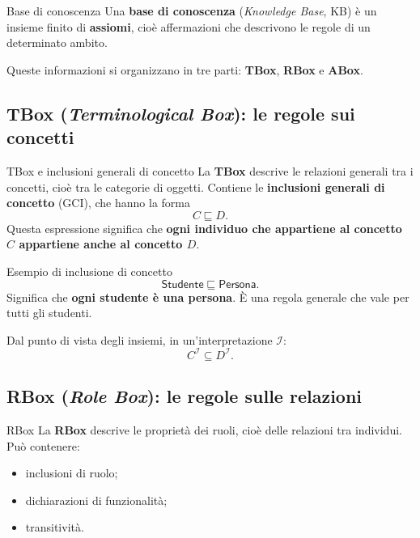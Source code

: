 \begin{definition}{Base di conoscenza}
    Una \textbf{base di conoscenza} (\emph{Knowledge Base}, KB) è un insieme
    finito di \textbf{assiomi}, cioè affermazioni che descrivono le regole di
    un determinato ambito.

    Queste informazioni si organizzano in tre parti: \textbf{TBox},
    \textbf{RBox} e \textbf{ABox}.
\end{definition}

\subsection{TBox (\emph{Terminological Box}): le regole sui concetti}

\begin{definition}{TBox e inclusioni generali di concetto}
    La \textbf{TBox} descrive le relazioni generali tra i concetti, cioè tra
    le categorie di oggetti. Contiene le \textbf{inclusioni generali di
    concetto} (GCI), che hanno la forma
    \[
        C\sqsubseteq D.
    \]
    Questa espressione significa che \textbf{ogni individuo che appartiene al
    concetto \(C\) appartiene anche al concetto \(D\)}.
\end{definition}

\begin{observation}{Esempio di inclusione di concetto}
    \[
        \mathsf{Studente}\sqsubseteq\mathsf{Persona}.
    \]
    Significa che \textbf{ogni studente è una persona}. È una regola generale
    che vale per tutti gli studenti.
\end{observation}

Dal punto di vista degli insiemi, in un'interpretazione \(\mathcal I\):
\[
    C^{\mathcal I}\subseteq D^{\mathcal I}.
\]

\subsection{RBox (\emph{Role Box}): le regole sulle relazioni}

\begin{definition}{RBox}
    La \textbf{RBox} descrive le proprietà dei ruoli, cioè delle relazioni tra
    individui. Può contenere:
    \begin{itemize}
        \item inclusioni di ruolo;
        \item dichiarazioni di funzionalità;
        \item transitività.
    \end{itemize}
\end{definition}

